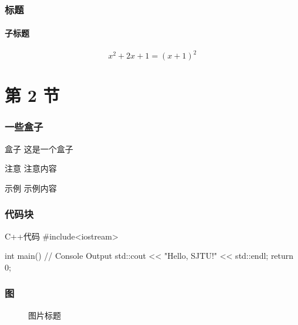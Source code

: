 \documentclass[
]{beamer}
\begin{document}
    \begin{frame}
        \frametitle{标题}
        \framesubtitle{子标题}

        \begin{equation}
            x^2+2x+1=(x+1)^2
        \end{equation}
        
    \end{frame}

\section{第 2 节}
    \begin{frame}
        \frametitle{一些盒子}
        
        \begin{block}{盒子}
            这是一个盒子\cite{beamerman}
        \end{block}

        \begin{alertblock}{注意}
            注意内容
        \end{alertblock}

        \begin{exampleblock}{示例}
            示例内容
        \end{exampleblock}
    \end{frame}

    \begin{frame}[fragile]          %
        \frametitle{代码块}
        \begin{codeblock}[language=c++]{C++代码}
#include<iostream>

int main(){
    // Console Output
    std::cout << "Hello, SJTU!" << std::endl;
    return 0;
}
        \end{codeblock}
    \end{frame}

    \begin{frame}
        \frametitle{图}
        \begin{figure}
            \centering
            \begin{stampbox}
            \end{stampbox}
            \caption{图片标题\cite{viman}}
        \end{figure}
    \end{frame}
\end{document}
